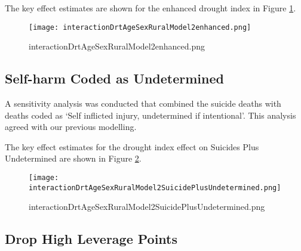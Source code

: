 \documentclass[a4paper]{article}                %
\begin{document}
        The key effect estimates are shown for the enhanced drought index in Figure \ref{fig:interactionDrtAgeSexRuralModel2enhanced.png}.

        \begin{figure}[!h]
        \centering
        \texttt{[image: interactionDrtAgeSexRuralModel2enhanced.png]}
        \caption{interactionDrtAgeSexRuralModel2enhanced.png}
        \label{fig:interactionDrtAgeSexRuralModel2enhanced.png}
        \end{figure}
        \clearpage



\subsection{Self-harm Coded as Undetermined}


        A sensitivity analysis was conducted that combined the suicide deaths with deaths coded as `Self inflicted injury, undetermined if intentional'. This analysis agreed with our previous modelling.

        The key effect estimates for the drought index effect on Suicides Plus Undetermined are shown in Figure \ref{fig:interactionDrtAgeSexRuralModel2SuicidePlusUndetermined.png}.

        \begin{figure}[!h]
        \centering
        \texttt{[image: interactionDrtAgeSexRuralModel2SuicidePlusUndetermined.png]}
        \caption{interactionDrtAgeSexRuralModel2SuicidePlusUndetermined.png}
        \label{fig:interactionDrtAgeSexRuralModel2SuicidePlusUndetermined.png}
        \end{figure}
        \clearpage



\subsection{Drop High Leverage Points}

\end{document}
